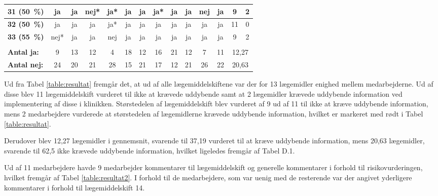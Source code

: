 \begin{longtable} {l|c|c|c|c|c|c|c|c|c|c|c|c|c}
\cellcolor[HTML]{C0C0C0}\textbf{31 (50~\%)}	&ja	&ja	&nej*&ja*	&ja	&ja	&ja*	&ja	&ja	&nej&	ja  & \cellcolor[HTML]{EFEFEF}9 & \cellcolor[HTML]{EFEFEF}2  \\ \hline
\cellcolor[HTML]{C0C0C0}\textbf{32 (50~\%)}	&\cellcolor[HTML]{ECF4FF}ja	&\cellcolor[HTML]{ECF4FF}ja	&\cellcolor[HTML]{ECF4FF}ja	&\cellcolor[HTML]{ECF4FF}ja*	&\cellcolor[HTML]{ECF4FF}ja	&\cellcolor[HTML]{ECF4FF}ja	&\cellcolor[HTML]{ECF4FF}ja	& \cellcolor[HTML]{ECF4FF}ja	&\cellcolor[HTML]{ECF4FF}ja	&\cellcolor[HTML]{ECF4FF}ja	&\cellcolor[HTML]{ECF4FF}ja  & \cellcolor[HTML]{EFEFEF}11 & \cellcolor[HTML]{EFEFEF}0\\ \hline
\cellcolor[HTML]{C0C0C0}\textbf{33 (55~\%)}	&nej*&	ja	&ja	&nej	&ja	&ja	&ja	&ja	&ja	&ja	&ja & \cellcolor[HTML]{EFEFEF}9 & \cellcolor[HTML]{EFEFEF}2\\ \hline
\rowcolor[HTML]{EFEFEF}\multicolumn{14}{r}{\textbf{Gennemsnit}}\\
\rowcolor[HTML]{EFEFEF}\textbf{Antal ja:} & 9 & 13 &	12 &	 4 &\cellcolor[HTML]{F6E6E5}18&	12&	16&	\cellcolor[HTML]{F6E6E5}21&	12&	7&	11 & \multicolumn{2}{c}{12,27}\\ \hline
\rowcolor[HTML]{EFEFEF}\textbf{Antal nej:} &24 &	20&	21&	28&	\cellcolor[HTML]{F6E6E5}15&	21&	17&	\cellcolor[HTML]{F6E6E5}12&	21&	26&	22 &\multicolumn{2}{c}{20,63} \\
\end{longtable}

Ud fra Tabel \ref{table:resultat} fremgår det, at ud af alle lægemiddelskiftene var der for 13 lægemidler enighed mellem medarbejderne. Ud af disse blev 11 lægemiddelskift vurderet til ikke at krævede uddybende samt at 2 lægemidler krævede uddybende information ved
implementering af disse i klinikken. Størstedelen af lægemiddelskift blev vurderet af 9 ud af 11 til ikke at kræve uddybende information, mens 2 medarbejdere vurderede at størstedelen af lægemidlerne krævede uddybende information, hvilket er markeret med
rødt i Tabel \ref{table:resultat}.

Derudover blev 12,27 lægemidler i gennemsnit, svarende til 37,19 %
vurderet til at kræve uddybende information, mens 20,63 lægemidler, svarende til 62,5 %
ikke krævede uddybende information, hvilket ligeledes fremgår af Tabel D.1.

Ud af 11 medarbejdere havde 9 medarbejder kommentarer til lægemiddelskift og generelle kommentarer i forhold til risikovurderingen, hvilket fremgår af Tabel \ref{table:resultat2}. I forhold til de medarbejdere, som var uenig med de resterende var der angivet yderligere kommentarer i forhold til lægemiddelskift 14. 

